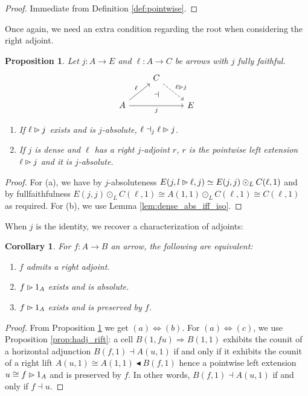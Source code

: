 \documentclass[10pt,a4paper]{article}
\newcommand{\To}{\Rightarrow}
\newcommand{\plext}{\mathbin{{\rhd}\mathclap{\mspace{-17.5mu}\cdot}}}
\newcommand{\rift}{\mathbin{\blacktriangleleft}}
\newcommand{\simeqq}{\cong}
\theoremstyle{plain}
\newtheorem{proposition}[theorem]{Proposition}
\newtheorem{corollary}[theorem]{Corollary}
\theoremstyle{definition}
\theoremstyle{remark}
\begin{document}
\begin{proof}
    Immediate from Definition \ref{def:pointwise}.
\end{proof}

Once again, we need an extra condition regarding the root when considering the right adjoint.

\begin{proposition}
    \label{prop:radj_radj_plext}
    Let $j : A \to E$ and $\ell : A \to C$ be arrows with $j$ fully faithful.
    \[\begin{tikzcd}
        &  C \ar[dr, dashed, "\ell\plext j"] &\\
        A \ar[ur, "\ell"] \ar[rr, "j"'] &{}& E
        \ar[from=1-2, to=2-2, phantom, "\dashv"{anchor=center}]
    \end{tikzcd}\]
    \begin{enumerate}
        \item If $\ell\plext j$ exists and is $j$-absolute, $\ell\dashv_j\ell\plext j$.
        \item If $j$ is dense and $\ell$ has a right $j$-adjoint $r$, $r$ is the pointwise left extension $\ell\plext j$ and it is $j$-absolute.
    \end{enumerate}
\end{proposition}

\begin{proof}
    For (a), we have by $j$-absoluteness $E(j, l\plext\ell, j)\simeq E(j, j)\odot_L C(\ell, 1)$ and by fullfaithfulness $E(j, j)\odot_L C(\ell, 1) \simeqq A(1, 1)\odot_L C(\ell, 1) \simeqq C(\ell, 1)$ as required. For (b), we use Lemma \ref{lem:dense_abs_iff_iso}.
\end{proof}

When $j$ is the identity, we recover a characterization of adjoints:

\begin{corollary}
    \label{cor:adjoint_arrow_theorem}
    For $f : A \to B$ an arrow, the following are equivalent:
    \begin{enumerate}
        \item $f$ admits a right adjoint.
        \item $f\plext 1_A$ exists and is absolute.
        \item $f\plext 1_A$ exists and is preserved by $f$.
    \end{enumerate}
\end{corollary}

\begin{proof}
    From Proposition \ref{prop:radj_radj_plext} we get $(a)\iff(b)$. For $(a)\iff(c)$, we use Proposition \ref{prop:hadj_rift}: a cell $B(1, fu) \To B(1, 1)$ exhibits the counit of a horizontal adjunction $B(f, 1)\dashv A(u, 1)$ if and only if it exhibits the counit of a right lift $A(u, 1)\simeqq A(1, 1)\rift B(f, 1)$ hence a pointwise left extension $u\simeqq f\plext 1_A$ and is preserved by $f$. In other words, $B(f, 1)\dashv A(u, 1)$ if and only if $f\dashv u$.
\end{proof}
\end{document}
